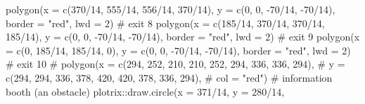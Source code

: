 \documentclass[
  letterpaper,
  DIV=11,
  numbers=noendperiod]{scrreprt}
\newenvironment{Shaded}{\begin{snugshade}}{\end{snugshade}}
\newcommand{\AttributeTok}[1]{\textcolor[rgb]{0.40,0.45,0.13}{#1}}
\newcommand{\CommentTok}[1]{\textcolor[rgb]{0.37,0.37,0.37}{#1}}
\newcommand{\DecValTok}[1]{\textcolor[rgb]{0.68,0.00,0.00}{#1}}
\newcommand{\FunctionTok}[1]{\textcolor[rgb]{0.28,0.35,0.67}{#1}}
\newcommand{\NormalTok}[1]{\textcolor[rgb]{0.00,0.23,0.31}{#1}}
\newcommand{\SpecialCharTok}[1]{\textcolor[rgb]{0.37,0.37,0.37}{#1}}
\newcommand{\StringTok}[1]{\textcolor[rgb]{0.13,0.47,0.30}{#1}}
\begin{document}
\begin{Shaded}
\begin{Highlighting}[]
  \FunctionTok{polygon}\NormalTok{(}\AttributeTok{x =} \FunctionTok{c}\NormalTok{(}\DecValTok{370}\SpecialCharTok{/}\DecValTok{14}\NormalTok{, }\DecValTok{555}\SpecialCharTok{/}\DecValTok{14}\NormalTok{, }\DecValTok{556}\SpecialCharTok{/}\DecValTok{14}\NormalTok{, }\DecValTok{370}\SpecialCharTok{/}\DecValTok{14}\NormalTok{),}
          \AttributeTok{y =} \FunctionTok{c}\NormalTok{(}\DecValTok{0}\NormalTok{, }\DecValTok{0}\NormalTok{, }\SpecialCharTok{{-}}\DecValTok{70}\SpecialCharTok{/}\DecValTok{14}\NormalTok{, }\SpecialCharTok{{-}}\DecValTok{70}\SpecialCharTok{/}\DecValTok{14}\NormalTok{),}
          \AttributeTok{border =} \StringTok{"red"}\NormalTok{,}
          \AttributeTok{lwd =} \DecValTok{2}\NormalTok{) }\CommentTok{\# exit 8}
  \FunctionTok{polygon}\NormalTok{(}\AttributeTok{x =} \FunctionTok{c}\NormalTok{(}\DecValTok{185}\SpecialCharTok{/}\DecValTok{14}\NormalTok{, }\DecValTok{370}\SpecialCharTok{/}\DecValTok{14}\NormalTok{, }\DecValTok{370}\SpecialCharTok{/}\DecValTok{14}\NormalTok{, }\DecValTok{185}\SpecialCharTok{/}\DecValTok{14}\NormalTok{),}
          \AttributeTok{y =} \FunctionTok{c}\NormalTok{(}\DecValTok{0}\NormalTok{, }\DecValTok{0}\NormalTok{, }\SpecialCharTok{{-}}\DecValTok{70}\SpecialCharTok{/}\DecValTok{14}\NormalTok{, }\SpecialCharTok{{-}}\DecValTok{70}\SpecialCharTok{/}\DecValTok{14}\NormalTok{),}
          \AttributeTok{border =} \StringTok{"red"}\NormalTok{,}
          \AttributeTok{lwd =} \DecValTok{2}\NormalTok{) }\CommentTok{\# exit 9}
  \FunctionTok{polygon}\NormalTok{(}\AttributeTok{x =} \FunctionTok{c}\NormalTok{(}\DecValTok{0}\NormalTok{, }\DecValTok{185}\SpecialCharTok{/}\DecValTok{14}\NormalTok{, }\DecValTok{185}\SpecialCharTok{/}\DecValTok{14}\NormalTok{, }\DecValTok{0}\NormalTok{),}
          \AttributeTok{y =} \FunctionTok{c}\NormalTok{(}\DecValTok{0}\NormalTok{, }\DecValTok{0}\NormalTok{, }\SpecialCharTok{{-}}\DecValTok{70}\SpecialCharTok{/}\DecValTok{14}\NormalTok{, }\SpecialCharTok{{-}}\DecValTok{70}\SpecialCharTok{/}\DecValTok{14}\NormalTok{),}
          \AttributeTok{border =} \StringTok{"red"}\NormalTok{,}
          \AttributeTok{lwd =} \DecValTok{2}\NormalTok{) }\CommentTok{\# exit 10}
  \CommentTok{\# polygon(x = c(294, 252, 210, 210, 252, 294, 336, 336, 294),}
  \CommentTok{\#         y = c(294, 294, 336, 378, 420, 420, 378, 336, 294),}
  \CommentTok{\#         col = "red") \# information booth (an obstacle)}
\NormalTok{  plotrix}\SpecialCharTok{::}\FunctionTok{draw.circle}\NormalTok{(}\AttributeTok{x =} \DecValTok{371}\SpecialCharTok{/}\DecValTok{14}\NormalTok{, }\AttributeTok{y =} \DecValTok{280}\SpecialCharTok{/}\DecValTok{14}\NormalTok{, }

\end{Highlighting}
\end{Shaded}
\end{document}
